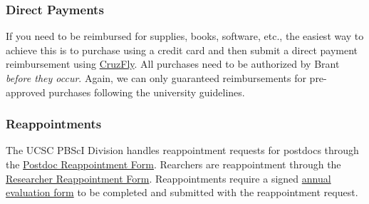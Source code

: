 \subsubsection{Direct Payments}
\label{sec:direct_payments}

If you need to be reimbursed for supplies, books, software, etc., the easiest way to achieve this is to purchase using a credit card and then submit a direct payment reimbursement using \href{http://cruzfly.ucsc.edu/}{CruzFly}. All purchases need to be authorized by Brant \emph{before they occur}. Again, we can only guaranteed reimbursements for pre-approved purchases following the university guidelines.

\subsubsection{Reappointments}
\label{sec:reappointments}

The UCSC PBScI Division handles reappointment requests for postdocs through the
\href{https://ucscforms.wufoo.com/forms/s1jkgiac0mds045/}{Postdoc Reappointment Form}.
Rearchers are reappointment through the  
\href{https://ucscforms.wufoo.com/forms/sta0lov0j8fq7s/}{Researcher Reappointment Form}. Reappointments require
a signed \href{https://apo.ucsc.edu/policy/capm/docs/610-000-appendix-e.pdf}{annual evaluation form} to be completed and submitted with the reappointment request.
